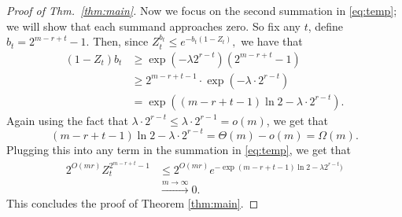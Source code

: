 \documentclass[10pt,a4paper]{amsart}
\begin{document}
\begin{proof}[Proof of Thm.~\ref{thm:main}]
Now we focus on the second summation in \eqref{eq:temp}; we will show that each summand approaches zero. So fix any $t$, define $b_t = 2^{ m-r + t } - 1 $. Then, since
$
    Z_t^{b_t} \leq e^{- b_t(1-Z_t) },
$
we have that
\begin{equation*}
\begin{aligned}  
        (1-Z_t ) b_t  &\geq \exp (-\lambda 2^{r-t} ) (  2^{m-r+t}  - 1 ) \\
        &\geq   2^{m-r+t-1 }\cdot \exp (-\lambda\cdot 2^{r-t} )\\
        &= \exp\left({ ( m - r + t -1 )\ln 2 - \lambda\cdot 2^{r-t}}\right).
 \end{aligned}
\end{equation*}
Again using the fact that $ \lambda\cdot 2^{r-t}\leq \lambda\cdot 2^{r-1} = o(m) $, we get that
\begin{equation*}
    ( m - r + t -1 )\ln 2 - \lambda\cdot 2^{r-t} = \Theta(m) - o(m) = \Omega(m). 
\end{equation*}
Plugging this into any term in the summation in \eqref{eq:temp}, we get that 
\begin{equation*}
    \begin{aligned}
        2^{ O(mr) } Z_t^{2^ { m-r+t} -1 }  &\leq 2^{O(mr) } e^{ -\exp( m - r + t -1 )\ln 2 - \lambda 2^{r-t})} \\ 
        &\xrightarrow{m\to \infty} 0.
    \end{aligned}
\end{equation*}
This concludes the proof of Theorem \ref{thm:main}.
\end{proof}
\end{document}
